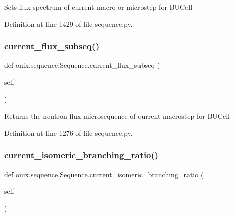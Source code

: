 \begin{DoxyVerb}Sets flux spectrum of current macro or microstep
for BUCell\end{DoxyVerb}
 

Definition at line 1429 of file sequence.\+py.

\mbox{\label{classonix_1_1sequence_1_1Sequence_aaf71d720b5530b4b2172891b93f45829}} 
\subsubsection{\texorpdfstring{current\+\_\+flux\+\_\+subseq()}{current\_flux\_subseq()}}
{\footnotesize\ttfamily def onix.\+sequence.\+Sequence.\+current\+\_\+flux\+\_\+subseq (\begin{DoxyParamCaption}\item[{}]{self }\end{DoxyParamCaption})}

\begin{DoxyVerb}Returns the neutron flux microsequence of current macrostep
for BUCell\end{DoxyVerb}
 

Definition at line 1276 of file sequence.\+py.

\mbox{\label{classonix_1_1sequence_1_1Sequence_ae09f34f2cb44a6240d404704f07b4b05}} 
\subsubsection{\texorpdfstring{current\+\_\+isomeric\+\_\+branching\+\_\+ratio()}{current\_isomeric\_branching\_ratio()}\hspace{0.1cm}{\footnotesize\ttfamily [1/2]}}
{\footnotesize\ttfamily def onix.\+sequence.\+Sequence.\+current\+\_\+isomeric\+\_\+branching\+\_\+ratio (\begin{DoxyParamCaption}\item[{}]{self }\end{DoxyParamCaption})}



